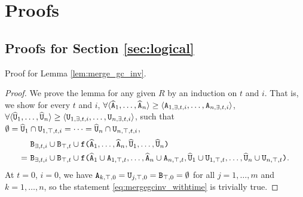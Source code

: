 
\section{Proofs}
\label{sec:proofs}


\subsection{Proofs for Section \ref{sec:logical}}
Proof for Lemma \ref{lem:merge_gc_inv}.

\begin{proof}
We prove the lemma for any given $R$ by an induction on $t$ and $i$.
That is, we show for every $t$ and $i$,
$\forall \langle \widehat{\tt{A}}_1, \dots, \widehat{\tt{A}}_n\rangle \geq \langle \tt{A}_{1,\exists,t,i},\dots,\tt{A}_{n,\exists,t,i} \rangle$,
$\forall \langle \widehat{\tt{U}}_1, \dots, \widehat{\tt{U}}_n\rangle \geq \langle \tt{U}_{1,\exists,t,i},\dots,\tt{U}_{n,\exists,t,i} \rangle$,
such that
$\emptyset = \widehat{\tt{U}}_1 \cap \tt{U}_{1,\top,t,i} = \dots =  \widehat{\tt{U}}_n \cap \tt{U}_{n,\top,t,i}$,
\begin{align}
&
\tt{B}_{\exists,t,i} \cup \tt{B}_{\top,t}
\cup
\tt{f(}
  \widehat{\tt{A}}_1,
    \dots,
    \widehat{\tt{A}}_n,
  \widehat{\tt{U}}_1,
    \dots,
    \widehat{\tt{U}}_n
\tt{)}
\nonumber\\
=~&
\tt{B}_{\exists,t,i} \cup \tt{B}_{\top,t}
\cup
\tt{f(}
  \widehat{\tt{A}}_1 \cup \tt{A}_{1,\top,t},
  \dots,
  \widehat{\tt{A}}_n \cup \tt{A}_{n,\top,t},
  \widehat{\tt{U}}_1 \cup \tt{U}_{1,\top,t},
  \dots,
  \widehat{\tt{U}}_n \cup \tt{U}_{n,\top,t}
\tt{)}. \label{eq:mergegcinv_withtime}
\end{align}
At $t=0$, $i=0$, we have $\tt{A}_{k,\top,0} = \tt{U}_{j,\top,0} = \tt{B}_{\top,0} = \emptyset$ for all $j=1,\dots,m$ and $k=1,\dots,n$, so the statement \eqref{eq:mergegcinv_withtime} is trivially true.


\end{proof}
